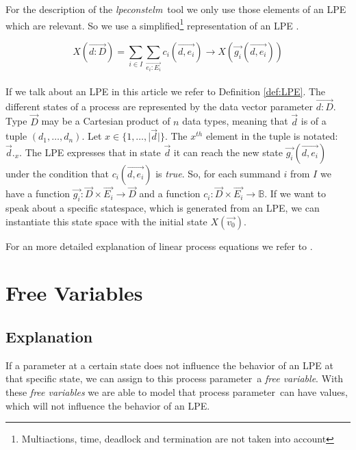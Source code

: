 \index{}\documentclass[a4paper,10pt]{article}
\theoremstyle{plain}
\theoremstyle{definition}
\newcommand{\lpe}{linear process equation}
\newcommand{\tool}{\textit{lpeconstelm}}
\newcommand{\ovr}{\overrightarrow}
\newcommand{\pp}{process parameter}
\newcommand{\ti}{\textit}
\begin{document}
\noindent For the description of the \tool\ tool we only use those elements of an LPE which are relevant. So we use a simplified\footnote{Multiactions, time, deadlock and termination are not taken into account} representation of an LPE .
\begin{defn}\label{def:LPE}
\begin{displaymath}
X (\ovr{d:D}) = \sum_{i \in I} \sum_{\ovr{e_i:E_i}} c_i ( \ovr{d, e_i}) \rightarrow X(\ovr{g_i}(\ovr{d,e_i}))
\end{displaymath}\\
If we talk about an LPE in this article we refer to Definition \ref{def:LPE}.  The different states 
of a process are represented by the data vector parameter $\ovr{d: D}$. Type $\ovr{D}$ may be a Cartesian product of $n$ data types, meaning that $\ovr{d}$ is of a tuple $(d_1, \ldots, d_n)$. 
Let $x \in \lbrace 1, \ldots , \vert \ovr{d} \vert \rbrace$. The $x^{th}$ element in the tuple is notated: $\ovr{d}._x$.
The LPE expresses that in state $\ovr{d}$ %
it can reach the new state $\ovr{g_i}(\ovr{d,e_i})$ under the condition that $c_i(\ovr{d,e_i})$ is \ti{true}. So, for each summand $i$ from $I$ we have a function $\ovr{g_i}: \ovr{D} \times \ovr{E_i} \rightarrow \ovr{D}$ and a function $c_i: \ovr{D} \times \ovr{E_i} \rightarrow \mathbb{B}$.
If we want to speak about a specific statespace, which is generated from an LPE, we can instantiate this state space with the initial state $X(\ovr{v_0})$. 

\noindent For an more detailed explanation of \lpe s  we refer to \cite{LPE_info}.
\end{defn}

\section{Free Variables}
\subsection{Explanation}

If a parameter at a certain state does not influence the behavior of an LPE at that specific state, we can assign to this \pp\ a \ti{free variable}. With these \ti{free variables} we are able to model that \pp\ can have values, which will not influence the behavior of an LPE.
\end{document}
